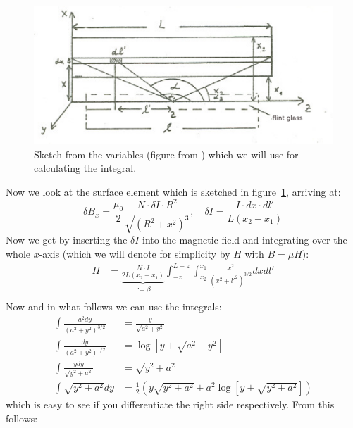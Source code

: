\begin{figure}
    \begin{centering}
        \includegraphics[width=14cm]{figures/integral}
\caption{Sketch from the variables (figure from \cite{staatsexamen}) which we will use
            for calculating the integral. 
            }
        \label{fig:integral}
    \end{centering}
\end{figure}
Now we look at the surface element which is sketched in figure~\ref{fig:integral},
arriving at:
\begin{equation}
 \delta B_x =  \frac{\mu_0}{2} \frac{N \cdot \delta I  \cdot R^2}{\sqrt{\left (R^2 + x^2 \right )^3}} ,
 \quad \delta I = \frac{ I \cdot dx \cdot dl'}{L(x_2 - x_1)}
\end{equation}
Now we get by inserting the $\delta I$ into the magnetic field and integrating over
the whole $x$-axis (which we will denote for simplicity by $H$ with $B = \mu H$):
\begin{align}
    H &= \underbrace{ \frac{ N\cdot I}{2 L (x_2 - x_1)} }_{:=\beta}
    \int^{L-z}_{-z} \int^{x_1}_{x_2} \frac{x^2}{(x^2 + l'^2)^{3/2}} dx dl'\\
\end{align}
Now and in what follows we can use the integrals:
\begin{align}
    \int \frac{a^2 dy}{(a^2 + y^2)^{3/2}}&=  \frac{y}{\sqrt{a^2 + y^2}} \\
    \int \frac{dy}{(a^2 + y^2)^{1/2}} &=  \log{\left [ y + \sqrt{a^2 + y^2} \right]}\\
    \int \frac{y dy}{\sqrt{y^2 + a^2}} &= \sqrt{y^2 + a^2} \\
    \int \sqrt{y^2 + a^2} dy &= \frac{1}{2} \left(
    y \sqrt{ y^2 + a^2} + a^2 \log \left [ y + \sqrt{y^2 + a^2} \right ] 
        \right )
\end{align}
which is easy to see if you differentiate the right side respectively. From this follows:
